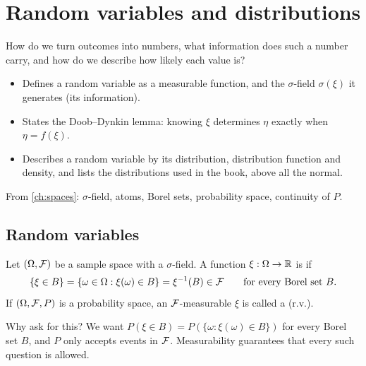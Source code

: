 \chapter{Random variables and distributions}
\label{ch:rv}

\begin{question}
How do we turn outcomes into numbers, what information does such a number carry, and how do we describe how likely each value is?
\end{question}

\begin{whatfor}
\begin{itemize}
  \item Defines a random variable as a measurable function, and the $\sigma$-field $\sigma(\xi)$ it generates (its information).
  \item States the Doob--Dynkin lemma: knowing $\xi$ determines $\eta$ exactly when $\eta=f(\xi)$.
  \item Describes a random variable by its distribution, distribution function and density, and lists the distributions used in the book, above all the normal.
\end{itemize}
\end{whatfor}

\begin{prereq}
From \cref{ch:spaces}: $\sigma$-field, atoms, Borel sets, probability space, continuity of $P$.
\end{prereq}

\section{Random variables}

\begin{definition}
\label{def:rv}
Let $(\Omega,\mathcal F)$ be a sample space with a $\sigma$-field. A function $\xi:\Omega\to\mathbb{R}$ is  if
\[
  \{\xi\in B\}=\{\omega\in\Omega:\xi(\omega)\in B\}=\xi^{-1}(B)\in\mathcal F\qquad\text{for every Borel set }B.
\]
If $(\Omega,\mathcal F,P)$ is a probability space, an $\mathcal F$-measurable $\xi$ is called a  (r.v.).
\end{definition}

Why ask for this? We want $P(\xi\in B)=P(\{\omega:\xi(\omega)\in B\})$ for every Borel set $B$, and $P$ only accepts events in $\mathcal F$. Measurability guarantees that every such question is allowed.

